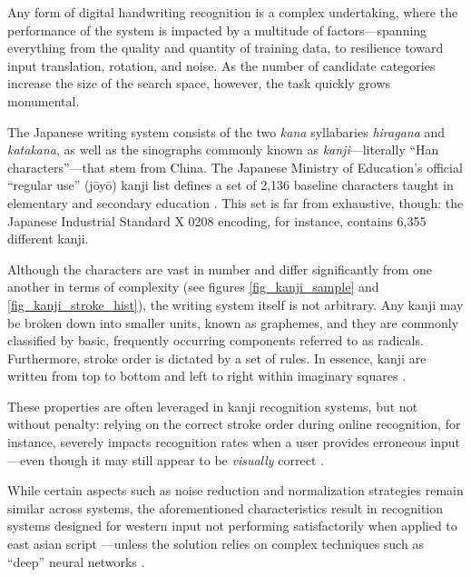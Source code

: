 \documentclass[10pt,conference,a4paper]{IEEEtran}
\begin{document}
	Any form of digital handwriting recognition is a complex undertaking,
	where the performance of the system is impacted by a multitude of factors---spanning
	everything from the quality and quantity of training data, to resilience toward input
	translation, rotation, and noise. As the number of candidate categories increase
	the size of the search space, however, the task quickly grows monumental.

	The Japanese writing system consists of the two \emph{kana} syllabaries \emph{hiragana} and \emph{katakana},
	as well as the sinographs commonly known as \emph{kanji}---literally ``Han characters''---that stem from China.
	The Japanese Ministry of Education's \mbox{official} ``regular use'' (j\=oy\=o) kanji list defines a set of 2,136
	baseline characters taught in elementary and secondary education \cite{hadamitzky2012japanese}.
	This set is far from exhaustive, though: the Japanese Industrial Standard X 0208 encoding, for instance, contains 6,355 different kanji.

	Although the characters are vast in number and differ significantly from one another in terms of complexity (see figures \ref{fig_kanji_sample}
	and \ref{fig_kanji_stroke_hist}), the writing system itself is not arbitrary. Any kanji may be broken down into smaller units, known as graphemes, 
	and they are commonly classified by basic, frequently occurring components referred to as radicals.
	Furthermore, stroke order is dictated by a set of rules. In essence, kanji are written from top to bottom and left to right within imaginary squares \cite{foerster1994kanji}.

	These properties are often leveraged in kanji recognition systems, but not without penalty: relying on the correct stroke order during online
	recognition, for instance, severely impacts recognition rates when a user provides erroneous input---even though it may still appear to be \emph{visually} correct \cite{shin2002optimal}.

	While certain aspects such as noise reduction and normalization strategies remain similar across systems, the aforementioned characteristics result in
	recognition systems designed for western input not performing satisfactorily when applied to east asian script \cite{jager2003state, tappert1990state}%
	---unless the solution relies on complex techniques such as  ``deep'' neural networks \cite{ciresan2012multi}.


\end{document}
